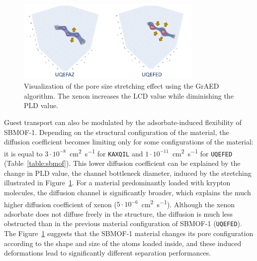 \documentclass[main]{subfiles}
\begin{document}
\begin{figure}[ht]
  \centering
  \includegraphics[width=0.8\textwidth]{figures/6-perspectives/KAXQIL_stretch.pdf}
  \caption{ Visualization of the pore size stretching effect using the GrAED algorithm. The xenon increases the LCD value while diminishing the PLD value. }\label{fgr:stretch}
\end{figure}

Guest transport can also be modulated by the adsorbate-induced flexibility of SBMOF-1. Depending on the structural configuration of the material, the diffusion coefficient becomes limiting only for some configurations of the material: it is equal to $3\cdot10^{-8}$~\si{\square\cm\per\s} for \texttt{KAXQIL} and $1\cdot10^{-11}$~\si{\square\cm\per\s} for \texttt{UQEFED} (Table~\ref{table:sbmof}). This lower diffusion coefficient can be explained by the change in PLD value, the channel bottleneck diameter, induced by the stretching illustrated in Figure~\ref{fgr:stretch}. For a material predominantly loaded with krypton molecules, the diffusion channel is significantly broader, which explains the much higher diffusion coefficient of xenon ($5\cdot10^{-6}$~\si{\square\cm\per\s}). Although the xenon adsorbate does not diffuse freely in the structure, the diffusion is much less obstructed than in the previous material configuration of SBMOF-1 (\texttt{UQEFED}). The Figure~\ref{fgr:stretch} suggests that the SBMOF-1 material changes its pore configuration according to the shape and size of the atoms loaded inside, and these induced deformations lead to significantly different separation performances.
\end{document}
